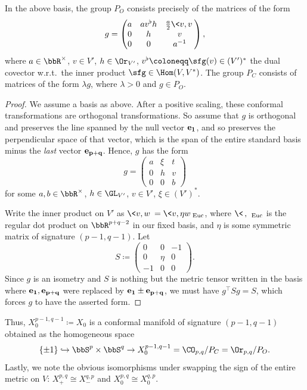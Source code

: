\begin{lem}
    In the above basis, the group $P_O$ consists precisely of the matrices of the form 
    \[g=\begin{pmatrix}
        a & av^\flat h & \frac{a}{2}\<v,v\>\\
        0 & h & v \\
        0 & 0 & a^{-1}
    \end{pmatrix},\]
    where $a\in \bbR^\times$, $v\in V'$, $h\in \Or_{V'}$, $v^\flat\coloneqq \sfg(v)\in (V')^\ast$ the dual covector w.r.t.\ the inner product $\sfg\in \Hom(V,V^\ast)$.  The group $P_C$ consists of matrices of the form $\lambda g$, where $\lambda>0$ and $g\in P_O$.
\end{lem}
\begin{proof}
    We assume a basis as above. After a positive scaling, these conformal transformations are orthogonal transformations. So assume that $g$ is orthogonal and preserves the line spanned by the null vector $\bf{e}_1$, and so preserves the perpendicular space of that vector, which is the span of the entire standard basis minus the \emph{last} vector $\bf{e}_{p+q}$. Hence, $g$ has the form 
    \[g=\begin{pmatrix}
        a & \xi & t\\
        0 & h & v\\
        0 & 0 & b
    \end{pmatrix}\]
    for some $a,b\in \bbR^\times$, $h\in \GL_{V'}$, $v\in V'$, $\xi\in (V')^\ast$.

    Write the inner product on $V'$ as $\<v,w\>=\<v,\eta w\>_{\mathrm{Euc}}$, where $\<\,,\,\>_{\mathrm{Euc}}$ is the regular dot product on $\bbR^{p+q-2}$ in our fixed basis, and $\eta$ is some symmetric matrix of signature $(p-1,q-1)$. Let 
    \[S\coloneqq \begin{pmatrix}
        0 & 0 & -1\\
        0 & \eta & 0 \\
        -1 & 0 & 0
    \end{pmatrix}.\]
    Since $g$ is an isometry and $S$ is nothing but the metric tensor written in the basis where $\bf{e}_1,\bf{e}_{p+q}$ were replaced by $\bf{e}_1\pm \bf{e}_{p+q}$, we must have $g^\top  Sg=S$, which forces $g$ to have the asserted form.
\end{proof}

Thus, $X_0^{p-1,q-1}\coloneqq X_0$ is a conformal manifold of signature $(p-1,q-1)$ obtained as the homogeneous space 
\[\{\pm 1\}\hookrightarrow \bbS^p\times\bbS^q\to X_0^{p-1,q-1}=\CO_{p,q}\slash P_C=\Or_{p,q}\slash P_O.\]
Lastly, we note the obvious isomorphisms under swapping the sign of the entire metric on $V$: $X_+^{p,q}\cong X_-^{q,p}$ and $X_0^{p,q}\cong X_0^{q,p}$.










